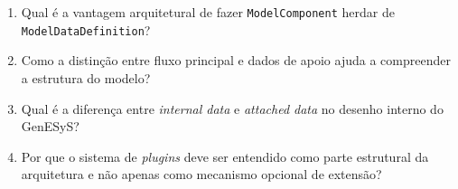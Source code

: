 \begin{enumerate}
    \item Qual é a vantagem arquitetural de fazer \texttt{ModelComponent} herdar de \texttt{ModelDataDefinition}?

    \item Como a distinção entre fluxo principal e dados de apoio ajuda a compreender a estrutura do modelo?

    \item Qual é a diferença entre \textit{internal data} e \textit{attached data} no desenho interno do GenESyS?

    \item Por que o sistema de \textit{plugins} deve ser entendido como parte estrutural da arquitetura e não apenas como mecanismo opcional de extensão?
\end{enumerate}